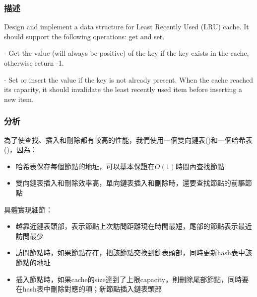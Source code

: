 \subsubsection{描述}
Design and implement a data structure for Least Recently Used (LRU) cache. It should support the following operations: get and set.

 - Get the value (will always be positive) of the key if the key exists in the cache, otherwise return -1.

 - Set or insert the value if the key is not already present. When the cache reached its capacity, it should invalidate the least recently used item before inserting a new item.


\subsubsection{分析}
為了使查找、插入和刪除都有較高的性能，我們使用一個雙向鏈表()和一個哈希表()，因為：
\begin{itemize}
\item{哈希表保存每個節點的地址，可以基本保證在$O(1)$時間內查找節點}
\item{雙向鏈表插入和刪除效率高，單向鏈表插入和刪除時，還要查找節點的前驅節點}
\end{itemize}

具體實現細節：
\begin{itemize}
\item{越靠近鏈表頭部，表示節點上次訪問距離現在時間最短，尾部的節點表示最近訪問最少}
\item{訪問節點時，如果節點存在，把該節點交換到鏈表頭部，同時更新hash表中該節點的地址}
\item{插入節點時，如果cache的size達到了上限capacity，則刪除尾部節點，同時要在hash表中刪除對應的項；新節點插入鏈表頭部}              
\end{itemize}


